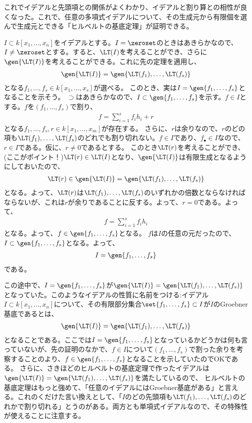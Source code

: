 これでイデアルと先頭項との関係がよくわかり、イデアルと割り算との相性が良くなった。これで、任意の多項式イデアルについて、その生成元から有限個を選んで生成元とできる「ヒルベルトの基底定理」が証明できる。
\begin{myproof}
  $I\subset k[x_1,\dots,x_n]$をイデアルとする。$I=\zeroset$のときはあきらかなので、$I\neq \zeroset$とする。すると、$\LT(I)$を考えることができ、さらに$\gen{\LT(I)}$を考えることができる。これに先の定理を適用し、
  \begin{align}
    \gen{\LT(I)} = \gen{\LT(f_1),\dots,\LT(f_s)}
  \end{align}
  となる$f_1,\dots,f_s \in k[x_1,\dots,x_s]$が選べる。
  このとき、実は$I = \gen{f_1,\dots,f_s}$となることを示そう。
  $\supset$はあきらかなので、$I\subset \gen{f_1,\dots,f_s}$を示す。$f \in I$とする。$f$を$(f_1,\dots,f_s)$で割り、
  \begin{align}
    f = \sum_{i=1}^s f_i h_i + r
  \end{align}
  となる$f_1,\dots,f_s,r \in k[x_1,\dots,x_m]$が存在する。
  さらに、$r$は余りなので、$r$のどの項も$\LT(f_1),\dots,\LT(f_s)$のどれでも割り切れない。$f\in I$であり、$f_\bullet \in I$なので、
  $r\in I$である。仮に、$r\neq 0$であるとする。
  このとき$\LT(r)$を考えることができ、(ここがポイント！)$\LT(r) \in \LT(I)$となり、$\gen{\LT(I)}$は有限生成となるようにしておいたので、
  \begin{align}
    \LT(r) \in \gen{\LT(I)} = \gen{\LT(f_1),\dots,\LT(f_s)}
  \end{align}
  となる。よって、$\LT(r)$は$\LT(f_1),\dots,\LT(f_s)$のいずれかの倍数とならなければならないが、これは$r$が余りであることに反する。よって、$r=0$である。よって、
  \begin{align}
    f= \sum_{i=1}^s f_i h_i
  \end{align}
  となる。よって、$f\in \gen{f_1,\dots,f_s}$となる。
  $f$は$I$の任意の元だったので、$I\subset \gen{f_1,\dots,f_s}$となる。よって、
  \begin{align}
    I = \gen{f_1,\dots,f_s}
  \end{align}
  である。
\end{myproof}

この途中で、$I=\gen{f_1,\dots,f_s}$が$\gen{\LT(I)} = \gen{\LT(f_1),\dots,\LT(f_s)}$となっていた。このようなイデアルの性質に名前をつける:イデアル$I\subset k[x_1,\dots,x_n]$について、その有限部分集合$\set{f_1,\dots,f_s} \subset I$が$I$のGroebner基底であるとは、
\begin{align}
  \gen{\LT(I)} = \gen{\LT(f_1),\dots,\LT(f_s)}
\end{align}
となることである。ここでは$I=\gen{f_1,\dots,f_s}$となっているかどうかは何も言っていないが、先の証明のなかで、$f\in I$について$(f_1,\dots,f_s)$で割った余りを考察することのより、$f\in \gen{f_1,\dots,f_s}$となることを示していたのでOKである。
さらに、さきほどのヒルベルトの基底定理で作ったイデアルは$\gen{\LT(I)}=\gen{\LT(f_1),\dots,\LT(f_s)}$を満たしているので、
ヒルベルトの基底定理はもっと強めて、「任意のイデアルにはGroebner基底がある」と言える。これのくだけた言い換えとして、「$I$のどの先頭項も$\LT(f_1),\dots,\LT(f_s)$のどれかで割り切れる」とうのがある。両方とも単項式イデアルなので、その特殊性が使えることに注意する。

